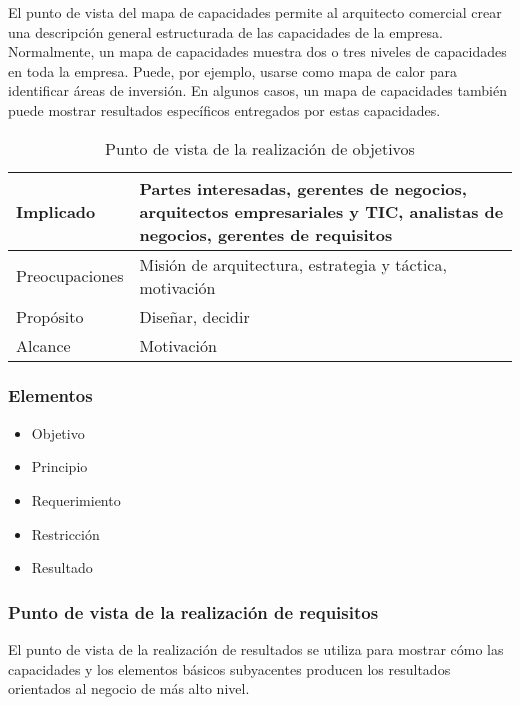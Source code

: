 El punto de vista del mapa de capacidades permite al arquitecto comercial crear una descripción general estructurada de las capacidades de la empresa. Normalmente, un mapa de capacidades muestra dos o tres niveles de capacidades en toda la empresa. Puede, por ejemplo, usarse como mapa de calor para identificar áreas de inversión. En algunos casos, un mapa de capacidades también puede mostrar resultados específicos entregados por estas capacidades.
\begin{table}[ht]
	\begin{center}
		
		\begin{tabular}{ | m{6em} | m{8cm}|  } 
			\hline
			Implicado & Partes interesadas, gerentes de negocios, arquitectos empresariales y TIC, analistas de negocios, gerentes de requisitos 
			\\
			\hline
			Preocupaciones & Misión de arquitectura, estrategia y táctica, motivación
			\\
			\hline
			Propósito & Diseñar, decidir
			\\
			\hline
			Alcance & Motivación
			\\
			\hline
		\end{tabular}
		\caption{Punto de vista de la realización de objetivos}
		\label{tab:concepts}
	\end{center}
\end{table}

\subsubsection{Elementos}
\begin{itemize}
	\item Objetivo
	\item Principio
	\item Requerimiento
	\item Restricción
	\item Resultado
\end{itemize}

\subsubsection{Punto de vista de la realización de requisitos}


El punto de vista de la realización de resultados se utiliza para mostrar cómo las capacidades y los elementos básicos subyacentes producen los resultados orientados al negocio de más alto nivel.

